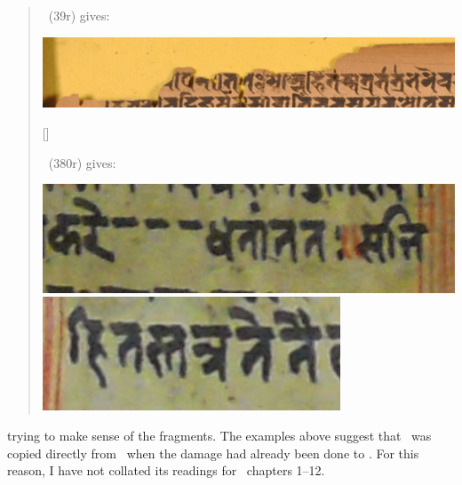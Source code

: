 \begin{quote}
\msNa\ (\fol39r) gives:

\includegraphics[scale=.21]{images/hitas_msNa.png}

[] 

\msL\ (\fol380r) gives:

\includegraphics[scale=.3]{images/hitas01_msL.png}
\includegraphics[scale=.3]{images/hitas02_msL.png}

\end{quote}

\noindent
trying to make sense of the fragments. The examples above
suggest that \msL\ was copied directly from \msNa\
when the damage had already been done to \msNa. For this reason,
I have not collated its readings for \VSS\ chapters 1--12.


\medskip







